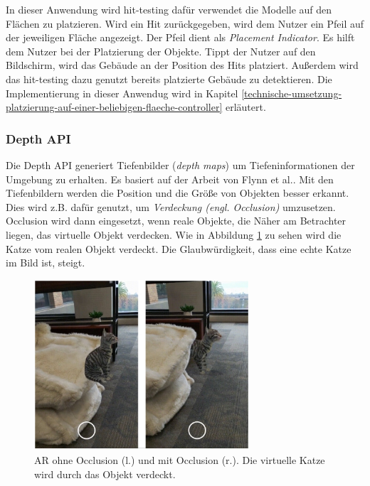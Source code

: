 In dieser Anwendung wird hit-testing dafür verwendet die Modelle auf den Flächen zu platzieren. Wird ein Hit zurückgegeben, wird dem Nutzer ein Pfeil auf der jeweiligen Fläche angezeigt. Der Pfeil dient als \textit{Placement Indicator}. Es hilft dem Nutzer bei der Platzierung der Objekte. Tippt der Nutzer auf den Bildschirm, wird das Gebäude an der Position des Hits platziert. Außerdem wird das hit-testing dazu genutzt bereits platzierte Gebäude zu detektieren. Die Implementierung in dieser Anwendug wird in Kapitel \ref*{technische-umsetzung-platzierung-auf-einer-beliebigen-flaeche-controller} erläutert. 

\subsubsection{Depth API}
\label{technische-umsetzung-arcore-depth-api}
Die Depth API generiert Tiefenbilder (\textit{depth maps}) um Tiefeninformationen der Umgebung zu erhalten. Es basiert auf der Arbeit von Flynn et al.\cite*{flynn2019}. Mit den Tiefenbildern werden die Position und die Größe von Objekten besser erkannt. Dies wird z.B. dafür genutzt, um \textit{Verdeckung (engl. Occlusion)} umzusetzen. Occlusion wird dann eingesetzt, wenn reale Objekte, die Näher am Betrachter liegen, das virtuelle Objekt verdecken. Wie in Abbildung \ref*{fig:anwendung-arcore-depth-api-occlusion} zu sehen wird die Katze vom realen Objekt verdeckt. Die Glaubwürdigkeit, dass eine echte Katze im Bild ist, steigt.

\begin{figure}[h]
    \centering
    \includegraphics[width=8cm]{img/anwendung/arcore/arcore-depth-api-occlusion.jpg}
    \caption[AR ohne Occlusion (l.) und mit Occlusion (r.). Die virtuelle Katze wird durch das Objekt verdeckt.]{AR ohne Occlusion (l.) und mit Occlusion (r.). Die virtuelle Katze wird durch das Objekt verdeckt.\protect\footnotemark}
    \label{fig:anwendung-arcore-depth-api-occlusion}
\end{figure}

